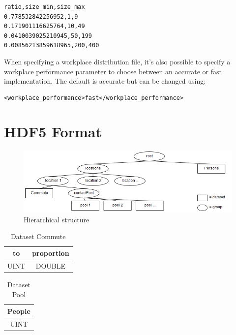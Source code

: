 \label{section:workplace_distribtion_file}

\begin{lstlisting}[caption={workplace\_file example},captionpos=b]
ratio,size_min,size_max
0.778532842256952,1,9
0.171901116625764,10,49
0.0410039025210945,50,199
0.00856213859618965,200,400
\end{lstlisting}

When specifying a workplace distribution file, it's also possible to specify a workplace performance parameter to choose between an accurate or fast implementation. The default is accurate but can be changed using:

\begin{lstlisting}[caption={workplace\_performance},captionpos=b]
<workplace_performance>fast</workplace_performance>
\end{lstlisting}

\begin{table}
\end{table}


\section{HDF5 Format} \label{hdf5_format}
\begin{figure}[!htb]
    \centering
    \includegraphics[width=12cm]{HDF5Format.jpg}
    \caption{Hierarchical structure}
    \label{fig:hdf5_structure}
\end{figure}

\begin{table}[!htb]
\begin{center}
\begin{tabular}{|c|c|}
\hline
to   & proportion \\ \hline
UINT & DOUBLE     \\ \hline   
\end{tabular}
\end{center}
\caption{\label{tab:commute}Dataset Commute}
\end{table}

\begin{table}[!htb]
\begin{center}
\begin{tabular}{|c|}
\hline
People    \\ \hline
UINT  \\ \hline   
\end{tabular}
\end{center}
\caption{\label{tab:pool}Dataset Pool}
\end{table}

